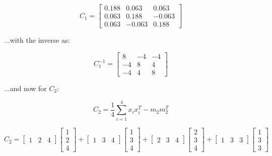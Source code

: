 \documentclass{article}
\begin{document}
\begin{equation}
    C_1 = \begin{bmatrix}
        0.188 & 0.063 & 0.063 \\
        0.063 & 0.188 & -0.063 \\
        0.063 & -0.063 & 0.188
    \end{bmatrix}
\end{equation}

\noindent ...with the inverse as:

\begin{equation}
    C_1^{-1} = \begin{bmatrix}
        8 & -4 & -4 \\
        -4 & 8 & 4 \\
        -4 & 4 & 8
    \end{bmatrix}
\end{equation}

\noindent ...and now for $C_2$:

\begin{equation}
    C_2 = \frac{1}{4} \sum^4_{i=1} x_i x_i^T - m_2 m_2^T
\end{equation}

\begin{equation}
    C_2 = \begin{bmatrix}
        1 & 2 & 4
    \end{bmatrix}\begin{bmatrix}
        1 \\ 2 \\ 4
    \end{bmatrix} + 
    \begin{bmatrix}
        1 & 3 & 4
    \end{bmatrix}
    \begin{bmatrix}
        1 \\ 3 \\ 4
    \end{bmatrix} +
    \begin{bmatrix}
        2 & 3 & 4
    \end{bmatrix}
    \begin{bmatrix}
        2 \\ 3 \\ 4
    \end{bmatrix} +
    \begin{bmatrix}
        1 & 3 & 3
    \end{bmatrix}
    \begin{bmatrix}
        1 \\ 3 \\ 3
    \end{bmatrix}
\end{equation}
\end{document}

